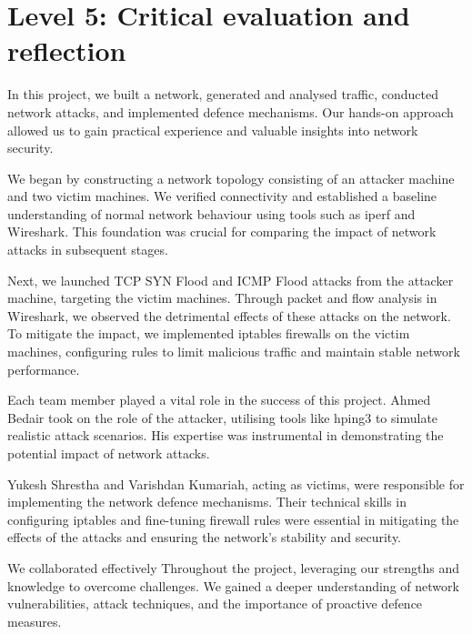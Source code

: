 \chapter{Level 5: Critical evaluation and reflection}

In this project, we built a network, generated and analysed traffic, conducted network attacks, and implemented defence mechanisms. Our hands-on approach allowed us to gain practical experience and valuable insights into network security.

We began by constructing a network topology consisting of an attacker machine and two victim machines. We verified connectivity and established a baseline understanding of normal network behaviour using tools such as iperf and Wireshark. This foundation was crucial for comparing the impact of network attacks in subsequent stages.

Next, we launched TCP SYN Flood and ICMP Flood attacks from the attacker machine, targeting the victim machines. Through packet and flow analysis in Wireshark, we observed the detrimental effects of these attacks on the network. To mitigate the impact, we implemented iptables firewalls on the victim machines, configuring rules to limit malicious traffic and maintain stable network performance.

Each team member played a vital role in the success of this project. Ahmed Bedair took on the role of the attacker, utilising tools like hping3 to simulate realistic attack scenarios. His expertise was instrumental in demonstrating the potential impact of network attacks.

Yukesh Shrestha and Varishdan Kumariah, acting as victims, were responsible for implementing the network defence mechanisms. Their technical skills in configuring iptables and fine-tuning firewall rules were essential in mitigating the effects of the attacks and ensuring the network's stability and security.

We collaborated effectively Throughout the project, leveraging our strengths and knowledge to overcome challenges. We gained a deeper understanding of network vulnerabilities, attack techniques, and the importance of proactive defence measures.